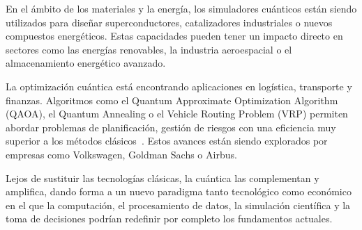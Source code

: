 En el ámbito de los materiales y la energía, los simuladores cuánticos están siendo utilizados para diseñar superconductores, catalizadores industriales o nuevos compuestos energéticos. Estas capacidades pueden tener un impacto directo en sectores como las energías renovables, la industria aeroespacial o el almacenamiento energético avanzado.

La optimización cuántica está encontrando aplicaciones en logística, transporte y finanzas. Algoritmos como el Quantum Approximate Optimization Algorithm (QAOA), el Quantum Annealing o el Vehicle Routing Problem (VRP) permiten abordar problemas de planificación, gestión de riesgos con una eficiencia muy superior a los métodos clásicos~\cite{Phillipson2024}. Estos avances están siendo explorados por empresas como Volkswagen, Goldman Sachs o Airbus.

Lejos de sustituir las tecnologías clásicas, la cuántica las complementan y amplifica, dando forma a un nuevo paradigma tanto tecnológico como económico en el que la computación, el procesamiento de datos, la simulación científica y la toma de decisiones podrían redefinir por completo los fundamentos actuales.
